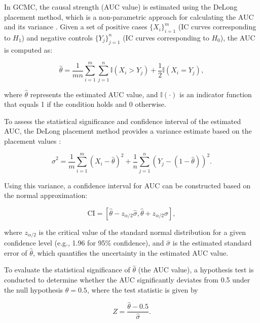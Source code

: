 \documentclass[authoryear,preprint,review,12pt]{elsarticle}
\begin{document}
In GCMC, the causal strength (AUC value) is estimated using the DeLong placement method, which is a non-parametric approach for calculating the AUC and its variance \citep{delong1988,sun2014delongfi}. Given a set of positive cases \(\{X_i\}_{i=1}^{m}\) (IC curves corresponding to \(H_1\)) and negative controls \(\{Y_j\}_{j=1}^{n}\) (IC curves corresponding to \(H_0\)), the AUC is computed as:

\begin{equation}
\hat{\theta} = \frac{1}{mn} \sum_{i=1}^{m} \sum_{j=1}^{n} \mathbb{I}(X_i > Y_j) + \frac{1}{2} \mathbb{I}(X_i = Y_j),
\end{equation}

\noindent where \(\hat{\theta}\) represents the estimated AUC value, and \(\mathbb{I}(\cdot)\) is an indicator function that equals 1 if the condition holds and 0 otherwise.  

To assess the statistical significance and confidence interval of the estimated AUC, the DeLong placement method provides a variance estimate based on the placement values \citep{delong1988,sun2014delongfi}:

\begin{equation}
\hat{\sigma}^2 = \frac{1}{m} \sum_{i=1}^{m} \left( X_i - \hat{\theta} \right)^2 + \frac{1}{n} \sum_{j=1}^{n} \left( Y_j - (1 - \hat{\theta}) \right)^2.
\end{equation}

Using this variance, a confidence interval for AUC can be constructed based on the normal approximation:

\begin{equation}
\text{CI} = \left[ \hat{\theta} - z_{\alpha/2} \hat{\sigma}, \hat{\theta} + z_{\alpha/2} \hat{\sigma} \right],
\end{equation}

\noindent where \( z_{\alpha/2} \) is the critical value of the standard normal distribution for a given confidence level (e.g., 1.96 for 95\% confidence), and \(\hat{\sigma} \) is the estimated standard error of \(\hat{\theta}\), which quantifies the uncertainty in the estimated AUC value.

To evaluate the statistical significance of \(\hat{\theta}\) (the AUC value), a hypothesis test is conducted to determine whether the AUC significantly deviates from 0.5 under the null hypothesis \(\theta = 0.5\), where the test statistic is given by

\begin{equation}
Z = \frac{\hat{\theta} - 0.5}{\hat{\sigma}}.
\end{equation}
\end{document}
